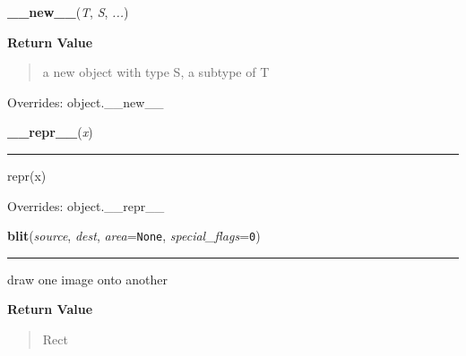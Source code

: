\hspace{.8\funcindent}\begin{boxedminipage}{\funcwidth}

    \raggedright \textbf{\_\_new\_\_}(\textit{T}, \textit{S}, \textit{...})

\setlength{\parskip}{2ex}
\setlength{\parskip}{1ex}
      \textbf{Return Value}
    \vspace{-1ex}

      \begin{quote}
      a new object with type S, a subtype of T

      \end{quote}

      Overrides: object.\_\_new\_\_

    \end{boxedminipage}

    \vspace{0.5ex}

\hspace{.8\funcindent}\begin{boxedminipage}{\funcwidth}

    \raggedright \textbf{\_\_repr\_\_}(\textit{x})

    \vspace{-1.5ex}

    \rule{\textwidth}{0.5\fboxrule}
\setlength{\parskip}{2ex}
    repr(x)

\setlength{\parskip}{1ex}
      Overrides: object.\_\_repr\_\_

    \end{boxedminipage}

    \label{pygame:Surface:blit}

    \vspace{0.5ex}

\hspace{.8\funcindent}\begin{boxedminipage}{\funcwidth}

    \raggedright \textbf{blit}(\textit{source}, \textit{dest}, \textit{area}={\tt None}, \textit{special\_flags}={\tt  0})

    \vspace{-1.5ex}

    \rule{\textwidth}{0.5\fboxrule}
\setlength{\parskip}{2ex}
    draw one image onto another

\setlength{\parskip}{1ex}
      \textbf{Return Value}
    \vspace{-1ex}

      \begin{quote}
      Rect

      \end{quote}

    \end{boxedminipage}

